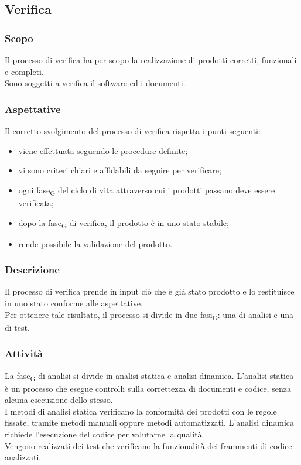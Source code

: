 \subsection{Verifica}
    \label{verifica}
    \subsubsection{Scopo}
    Il processo di verifica ha per scopo la realizzazione di prodotti corretti, funzionali e completi.\\Sono soggetti a verifica il software ed i documenti.
    \subsubsection{Aspettative}
    Il corretto svolgimento del processo di verifica rispetta i punti seguenti:
    \begin{itemize}
    	\item viene effettuata seguendo le procedure definite;
    	\item vi sono criteri chiari e affidabili da seguire per verificare;
    	\item ogni fase\textsubscript{G} del ciclo di vita attraverso cui i prodotti passano deve essere verificata;
    	\item dopo la fase\textsubscript{G} di  verifica, il prodotto è in uno stato stabile;
    	\item rende possibile la validazione del prodotto.
    \end{itemize}
    \subsubsection{Descrizione}
    Il processo di verifica prende in input ciò che è già stato prodotto e lo restituisce in uno stato conforme alle aspettative.\\Per ottenere tale risultato, il processo si divide in due fasi\textsubscript{G}: una di analisi e una di test.
    \subsubsection{Attività}
    La fase\textsubscript{G} di analisi si divide in analisi statica e analisi dinamica.
    L'analisi statica è un processo che esegue controlli sulla correttezza di documenti e codice, senza alcuna esecuzione dello stesso.\\I metodi di analisi statica verificano la conformità dei prodotti con le regole fissate, tramite metodi manuali oppure metodi automatizzati.
    L'analisi dinamica richiede l'esecuzione del codice per valutarne la qualità.\\Vengono realizzati dei test  che verificano la funzionalità dei frammenti di codice analizzati.


